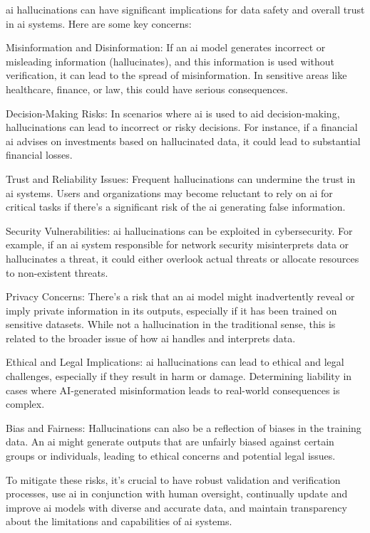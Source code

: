 \begin{aibox}%
  \Gls{ai} hallucinations can have significant implications for data safety and overall trust in \gls{ai} systems. Here are some key concerns:

Misinformation and Disinformation: If an \gls{ai} model generates incorrect or misleading \gls{information} (hallucinates), and this \gls{information} is used without verification, it can lead to the spread of misinformation. In sensitive areas like healthcare, finance, or law, this could have serious consequences.

Decision-Making Risks: In scenarios where \gls{ai} is used to aid decision-making, hallucinations can lead to incorrect or risky decisions. For instance, if a financial \gls{ai} advises on investments based on hallucinated data, it could lead to substantial financial losses.

Trust and Reliability Issues: Frequent hallucinations can undermine the trust in \gls{ai} systems. Users and organizations may become reluctant to rely on \gls{ai} for critical tasks if there's a significant risk of the \gls{ai} generating false \gls{information}.

Security Vulnerabilities: \gls{ai} hallucinations can be exploited in cybersecurity. For example, if an \gls{ai} system responsible for network security misinterprets data or hallucinates a threat, it could either overlook actual threats or allocate resources to non-existent threats.

Privacy Concerns: There’s a risk that an \gls{ai} model might inadvertently reveal or imply private \gls{information} in its outputs, especially if it has been trained on sensitive \glspl{dataset}. While not a hallucination in the traditional sense, this is related to the broader issue of how \gls{ai} handles and interprets data.

Ethical and Legal Implications: \gls{ai} hallucinations can lead to ethical and legal challenges, especially if they result in harm or damage. Determining liability in cases where AI-generated misinformation leads to real-world consequences is complex.

Bias and Fairness: Hallucinations can also be a reflection of biases in the training data. An \gls{ai} might generate outputs that are unfairly biased against certain groups or individuals, leading to ethical concerns and potential legal issues.

To mitigate these risks, it's crucial to have robust \gls{validation} and \gls{verification} processes, use \gls{ai} in conjunction with human oversight, continually update and improve \gls{ai} models with diverse and accurate data, and maintain transparency about the limitations and capabilities of \gls{ai} systems.
\end{aibox}

